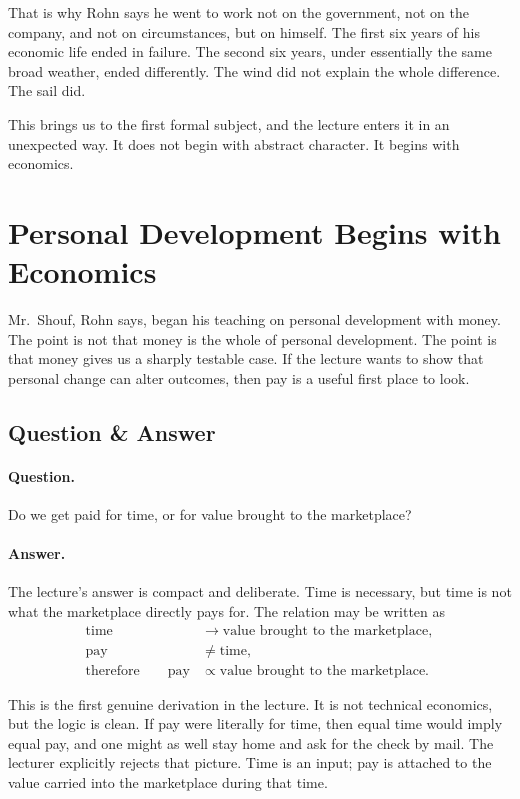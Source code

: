That is why Rohn says he went to work not on the government, not on the company, and not on circumstances, but on himself. The first six years of his economic life ended in failure. The second six years, under essentially the same broad weather, ended differently. The wind did not explain the whole difference. The sail did.

This brings us to the first formal subject, and the lecture enters it in an unexpected way. It does not begin with abstract character. It begins with economics.

\section{Personal Development Begins with Economics}

Mr.~Shouf, Rohn says, began his teaching on personal development with money. The point is not that money is the whole of personal development. The point is that money gives us a sharply testable case. If the lecture wants to show that personal change can alter outcomes, then pay is a useful first place to look.

\subsection{Question \& Answer}

\paragraph{Question.} Do we get paid for time, or for value brought to the marketplace?

\paragraph{Answer.} The lecture's answer is compact and deliberate. Time is necessary, but time is not what the marketplace directly pays for. The relation may be written as
\begin{align}
\text{time} &\longrightarrow \text{value brought to the marketplace},\\
\text{pay} &\neq \text{time},\\
\text{therefore}\qquad \text{pay} &\propto \text{value brought to the marketplace}.
\end{align}

This is the first genuine derivation in the lecture. It is not technical economics, but the logic is clean. If pay were literally for time, then equal time would imply equal pay, and one might as well stay home and ask for the check by mail. The lecturer explicitly rejects that picture. Time is an input; pay is attached to the value carried into the marketplace during that time.

